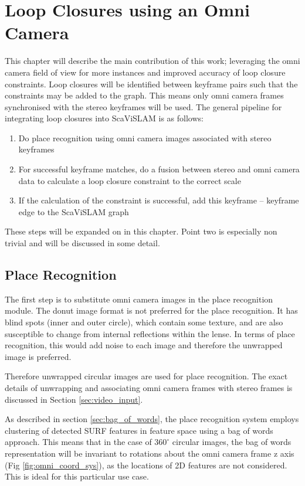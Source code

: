 \chapter{Loop Closures using an Omni Camera}
\label{chapter:omni_loop_close}

This chapter will describe the main contribution of this work; leveraging the omni camera field of view for more instances and improved accuracy of loop closure constraints.  Loop closures will be identified between keyframe pairs such that the constraints may be added to the graph.  This means only omni camera frames synchronised with the stereo keyframes will be used.
The general pipeline for integrating loop closures into ScaViSLAM is as follows: 
\begin{enumerate} \itemsep1pt  \parskip0pt 
 \item Do place recognition using omni camera images associated with stereo keyframes
 \item For successful keyframe matches, do a fusion between stereo and omni camera data to calculate a loop closure constraint to the correct scale
 \item If the calculation of the constraint is successful, add this keyframe -- keyframe edge to the ScaViSLAM graph
\end{enumerate}
These steps will be expanded on in this chapter.  Point two is especially non trivial and will be discussed in some detail. 

\section{Place Recognition}

The first step is to substitute omni camera images in the place recognition module. The donut image format is not preferred for the place recognition.  It has blind spots (inner and outer circle), which contain some texture, and are also susceptible to change from internal reflections within the lense.  In terms of place recognition, this would add noise to each image and therefore the unwrapped image is preferred.

Therefore unwrapped circular images are used for place recognition.  The exact details of unwrapping and associating omni camera frames with stereo frames is discussed in Section \ref{sec:video_input}.

As described in section \ref{sec:bag_of_words}, the place recognition system employs clustering of detected SURF features in feature space using a bag of words approach.  This means that in the case of $360^\circ$ circular images, the bag of words representation will be invariant to rotations about the omni camera frame z axis (Fig \ref{fig:omni_coord_sys}), as the locations of 2D features are not considered.  This is ideal for this particular use case.

